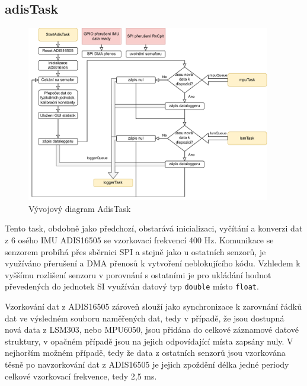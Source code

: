 \subsection{adisTask}
\begin{figure}[h]
    \centering
    \includegraphics[width=0.95\textwidth]{obrazky/AdisTask}
    \caption{Vývojový diagram AdisTask}
\end{figure}
Tento task, obdobně jako předchozí, obstarává inicializaci, vyčítání a konverzi dat z 6 osého IMU ADIS16505 se vzorkovací frekvencí 400 Hz. Komunikace se senzorem probíhá přes sběrnici SPI a stejně jako u ostatních senzorů, je využíváno přerušení a DMA přenosů k vytvoření neblokujícího kódu. Vzhledem k vyššímu rozlišení senzoru v porovnání s ostatními je pro ukládání hodnot převedených do jednotek SI využíván datový typ \texttt{double} místo \texttt{float}.

Vzorkování dat z ADIS16505 zároveň slouží jako synchronizace k zarovnání řádků dat ve výsledném souboru naměřených dat, tedy v případě, že jsou dostupná nová data z LSM303, nebo MPU6050, jsou přidána do celkové záznamové datové struktury, v opačném případě jsou na jejich odpovídající místa zapsány nuly. V nejhorším možném případě, tedy že data z ostatních senzorů jsou vzorkována těsně po navzorkování dat z ADIS16505 je jejich zpoždění délka jedné periody celkové vzorkovací frekvence, tedy 2,5 ms.

